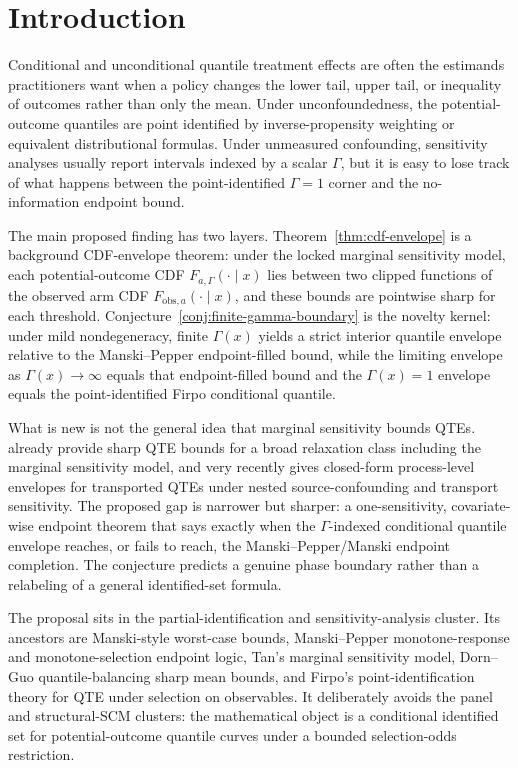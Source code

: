 \documentclass[11pt]{article}
\theoremstyle{definition}
\theoremstyle{plain}
\theoremstyle{remark}
\begin{document}
\section{Introduction}
Conditional and unconditional quantile treatment effects are often the estimands practitioners want when a policy changes the lower tail, upper tail, or inequality of outcomes rather than only the mean.  Under unconfoundedness, the potential-outcome quantiles are point identified by inverse-propensity weighting or equivalent distributional formulas.  Under unmeasured confounding, sensitivity analyses usually report intervals indexed by a scalar \(\Gamma\), but it is easy to lose track of what happens between the point-identified \(\Gamma=1\) corner and the no-information endpoint bound.

The main proposed finding has two layers.  Theorem~\ref{thm:cdf-envelope} is a background CDF-envelope theorem: under the locked marginal sensitivity model, each potential-outcome CDF \(F_{a,\Gamma}(\cdot\mid x)\) lies between two clipped functions of the observed arm CDF \(F_{\mathrm{obs},a}(\cdot\mid x)\), and these bounds are pointwise sharp for each threshold.  Conjecture~\ref{conj:finite-gamma-boundary} is the novelty kernel: under mild nondegeneracy, finite \(\Gamma(x)\) yields a strict interior quantile envelope relative to the Manski--Pepper endpoint-filled bound, while the limiting envelope as \(\Gamma(x)\to\infty\) equals that endpoint-filled bound and the \(\Gamma(x)=1\) envelope equals the point-identified Firpo conditional quantile.

What is new is not the general idea that marginal sensitivity bounds QTEs.  \citet{MastenPoirierRen2025} already provide sharp QTE bounds for a broad relaxation class including the marginal sensitivity model, and \citet{Wang2026} very recently gives closed-form process-level envelopes for transported QTEs under nested source-confounding and transport sensitivity.  The proposed gap is narrower but sharper: a one-sensitivity, covariate-wise endpoint theorem that says exactly when the \(\Gamma\)-indexed conditional quantile envelope reaches, or fails to reach, the Manski--Pepper/Manski endpoint completion.  The conjecture predicts a genuine phase boundary rather than a relabeling of a general identified-set formula.

The proposal sits in the partial-identification and sensitivity-analysis cluster.  Its ancestors are Manski-style worst-case bounds, Manski--Pepper monotone-response and monotone-selection endpoint logic, Tan's marginal sensitivity model, Dorn--Guo quantile-balancing sharp mean bounds, and Firpo's point-identification theory for QTE under selection on observables.  It deliberately avoids the panel and structural-SCM clusters: the mathematical object is a conditional identified set for potential-outcome quantile curves under a bounded selection-odds restriction.
\end{document}
